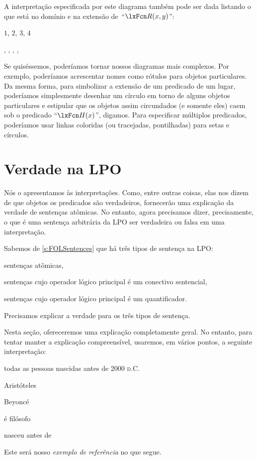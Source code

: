 A interpretação especificada por este diagrama também pode ser dada listando o que está no domínio e na extensão de~\textquotedblleft $\atom{R}{x,y}$\textquotedblright{}:
	\begin{ekey}
\item[\text{domínio}] $1$, $2$, $3$, $4$
	\item[R(x,y)] ,
		,
		,
		,
	\end{ekey}
Se quiséssemos, poderíamos tornar nossos diagramas mais complexos. Por exemplo, poderíamos acrescentar nomes como rótulos para objetos particulares. Da mesma forma, para simbolizar a extensão de um predicado de um lugar, poderíamos simplesmente desenhar um círculo em torno de alguns objetos particulares e estipular que os objetos assim circundados (e somente eles) caem sob o predicado \textquotedblleft $\atom{H}{x}$\textquotedblright{}, digamos. Para especificar múltiplos predicados, poderíamos usar linhas coloridas (ou tracejadas, pontilhadas) para setas e círculos.


\chapter{Verdade na LPO}\label{s:TruthFOL}
Nós o apresentamos às interpretações. Como, entre outras coisas, elas nos dizem de que objetos os predicados são verdadeiros, fornecerão uma explicação da verdade de sentenças atômicas. No entanto, agora precisamos dizer, precisamente, o que é uma sentença arbitrária da LPO ser verdadeira ou falsa em uma interpretação.

Sabemos de \cref{s:FOLSentences} que há três tipos de sentença na LPO:
	\begin{compactlist}
\item sentenças atômicas,
\item sentenças cujo operador lógico principal é um conectivo sentencial,
\item sentenças cujo operador lógico principal é um quantificador.
	\end{compactlist}
Precisamos explicar a verdade para os três tipos de sentença.

Nesta seção, ofereceremos uma explicação completamente geral. No entanto, para tentar manter a explicação compreensível, usaremos, em vários pontos, a seguinte interpretação:
	\begin{ekey}
\item[\text{domínio}] todas as pessoas nascidas antes de 2000 \textsc{d.C.}
		\item[a] Aristóteles
		\item[b] Beyonc\'e
\item[\atom{P}{x}]  é filósofo
\item[\atom{R}{x,y}]  nasceu antes de 
	\end{ekey}
Este será nosso \emph{exemplo de referência} no que segue.

